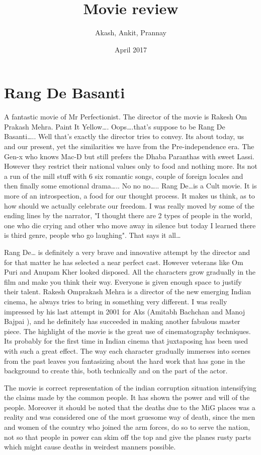 \documentclass{article}
\title{Movie review}
\author{Akash, Ankit, Prannay}
\date{April 2017}
\begin{document}
\maketitle

\section*{Rang De Basanti}
A fantastic movie of Mr Perfectionist.
The director of the movie is Rakesh Om Prakash Mehra.
Paint It Yellow…. Oops….that's suppose to be Rang De Basanti….. Well that's exactly the director tries to convey. Its about today, us and our present, yet the similarities we have from the Pre-independence era. The Gen-x who knows Mac-D but still prefers the Dhaba Paranthas with sweet Lassi. However they restrict their national values only to food and nothing more. Its not a run of the mill stuff with 6 six romantic songs, couple of foreign locales and then finally some emotional drama….. No no no….. Rang De…is a Cult movie. It is more of an introspection, a food for our thought process. It makes us think, as to how should we actually celebrate our freedom. I was really moved by some of the ending lines by the narrator, "I thought there are 2 types of people in the world, one who die crying and other who move away in silence but today I learned there is third genre, people who go laughing". That says it all… 

Rang De… is definitely a very brave and innovative attempt by the director and for that matter he has selected a near perfect cast. However veterans like Om Puri and Anupam Kher looked disposed. All the characters grow gradually in the film and make you think their way. Everyone is given enough space to justify their talent. Rakesh Omprakash Mehra is a director of the new emerging Indian cinema, he always tries to bring in something very different. I was really impressed by his last attempt in 2001 for Aks (Amitabh Bachchan and Manoj Bajpai ), and he definitely has succeeded in making another fabulous master piece. The highlight of the movie is the great use of cinematography techniques. Its probably for the first time in Indian cinema that juxtaposing has been used with such a great effect. The way each character gradually immerses into scenes from the past leaves you fantasizing about the hard work that has gone in the background to create this, both technically and on the part of the actor.

The movie is correct representation of the indian corruption situation intensifying the claims made by the common people. It has shown the power and will of the people. Moreover it should be noted that the deaths due to the MiG places was a reality and was considered one of the most gruesome way of death, since the men and women of the country who joined the arm forces, do so to serve the nation, not so that people in power can skim off the top and give the planes rusty parts which might cause deaths in weirdest manners possible. 
\end{document}
